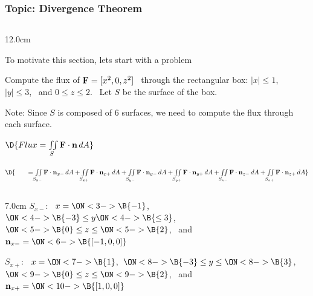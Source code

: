 \begin{frame}
\frametitle{Topic: Divergence Theorem}
\begin{columns}\begin{column}{12.0cm}

\scriptsize

\vspace{0.2cm}

To motivate this section, lets start with a problem

\vspace{0.2cm}

Compute the flux of ${\bf F} = [x^2,0,z^2]$ \, through the rectangular box: $|x| \le 1$, \, $|y| \le 3$, \, and $0 \le z \le 2$. \, Let $S$ be the surface of the box.

\vspace{0.2cm}

Note: Since $S$ is composed of 6 surfaces, we need to compute the flux through each surface.


\vspace{0.2cm}
 
$\D{Flux = \iint \limits_{S} {\bf F} \cdot {\bf n}\, dA}$

$\D{ \qquad = \iint \limits_{S_{x-}} {\bf F} \cdot {\bf n}_{x-}\, dA + \iint \limits_{S_{x+}} {\bf F} \cdot {\bf n}_{x+}\, dA + \iint \limits_{S_{y-}} {\bf F} \cdot {\bf n}_{y-}\, dA + \iint \limits_{S_{y+}} {\bf F} \cdot {\bf n}_{y+}\, dA + \iint \limits_{S_{z-}} {\bf F} \cdot {\bf n}_{z-}\, dA + \iint \limits_{S_{z+}} {\bf F} \cdot {\bf n}_{z+}\, dA}$

\vspace{0.2cm}

\begin{columns}
\begin{column}{7.0cm}
	$S_{x-}$: \, 
	$x=\ON<3->{\B{-1}}$,\, 
	$\ON<4->{\B{-3}} \le y 
	\ON<4->{\B{\le 3}}$,\, 
	$\ON<5->{\B{0}} \le z \le 
	\ON<5->{\B{2}}$, \, and \, ${\bf n}_{x-} = 
	\ON<6->{\B{[-1,0,0]}}$
	
	\vspace{0.4cm}
	
	$S_{x+}$: \, 
	$x=\ON<7->{\B{1}}$,\, 
	$\ON<8->{\B{-3}} \le y \le 
	\ON<8->{\B{3}}$,\, 
	$\ON<9->{\B{0}} \le z \le 
	\ON<9->{\B{2}}$, \, and \, ${\bf n}_{x+} = 
	\ON<10->{\B{[1,0,0]}}$
	

\end{column}
\end{columns}
\end{column}
\end{columns}
\end{frame}
